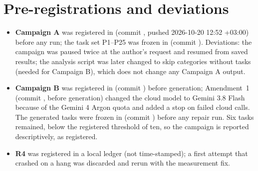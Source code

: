 \documentclass[11pt]{article}
\begin{document}
\section{Pre-registrations and deviations}\label{app:prereg}
\begin{itemize}
\item \textbf{Campaign A} was registered in  (commit , pushed 2026-10-20 12:52 +03:00) before any run; the task set P1--P25 was frozen in  (commit ). Deviations: the campaign was paused twice at the author's request and resumed from saved results; the analysis script was later changed to skip categories without tasks (needed for Campaign B), which does not change any Campaign A output.
\item \textbf{Campaign B} was registered in  (commit ) before generation; Amendment~1 (commit , before generation) changed the cloud model to Gemini 3.8 Flash because of the Gemini 4 Argon quota and added a stop on failed cloud calls. The generated tasks were frozen in  (commit ) before any repair run. Six tasks remained, below the registered threshold of ten, so the campaign is reported descriptively, as registered.
\item \textbf{R4} was registered in a local ledger (not time-stamped); a first attempt that crashed on a hang was discarded and rerun with the measurement fix.
\end{itemize}

\clearpage
\end{document}
